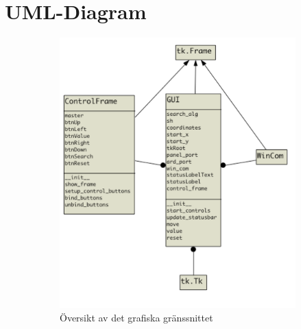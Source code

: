 \section{UML-Diagram} %
\label{sec:uml_diagram}

\begin{figure}[h]
    \centering
    \begin{subfigure}{0.49\textwidth}
        \includegraphics[width=\textwidth]{res/img/GUI_uml}
        \caption{Översikt av det grafiska gränssnittet}
    \end{subfigure}
    \begin{subfigure}{0.49\textwidth}

\end{subfigure}
\end{figure}
